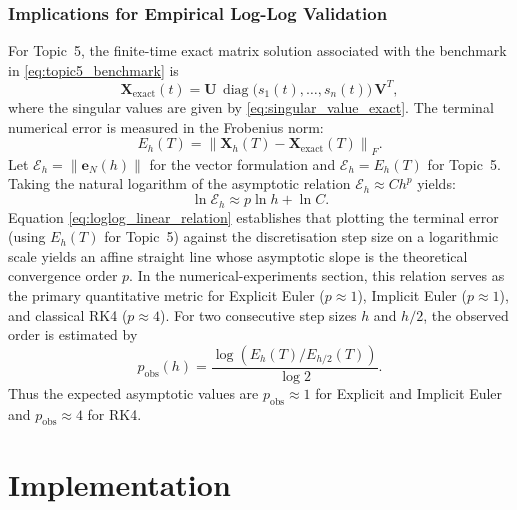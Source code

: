 \documentclass[11pt,a4paper]{article}
\theoremstyle{definition}
\theoremstyle{remark}
\begin{document}
\subsubsection{Implications for Empirical Log-Log Validation}
For Topic~5, the finite-time exact matrix solution associated with the
benchmark in \eqref{eq:topic5_benchmark} is
\begin{equation}
\label{eq:topic5_exact_matrix_solution}
\mathbf{X}_{\mathrm{exact}}(t)
=
\mathbf{U}\,\operatorname{diag}\bigl(s_1(t),\ldots,s_n(t)\bigr)\,\mathbf{V}^T,
\end{equation}
where the singular values are given by \eqref{eq:singular_value_exact}.
The terminal numerical error is measured in the Frobenius norm:
\begin{equation}
\label{eq:topic5_frobenius_error}
E_h(T)=\left\|\mathbf{X}_h(T)-\mathbf{X}_{\mathrm{exact}}(T)\right\|_F.
\end{equation}
Let $\mathcal{E}_h=\|\mathbf{e}_N(h)\|$ for the vector formulation
and $\mathcal{E}_h=E_h(T)$ for Topic~5. Taking the natural logarithm of
the asymptotic relation $\mathcal{E}_h\approx C h^p$ yields:
\begin{equation}
\label{eq:loglog_linear_relation}
\ln \mathcal{E}_h \approx p \ln h + \ln C.
\end{equation}
Equation \eqref{eq:loglog_linear_relation} establishes that plotting the
terminal error (using $E_h(T)$ for Topic~5) against the discretisation
step size on a logarithmic scale yields an affine straight line whose
asymptotic slope is the theoretical convergence order $p$. In the
numerical-experiments section, this relation serves as the primary
quantitative metric for Explicit Euler ($p\approx1$), Implicit Euler
($p\approx1$), and classical RK4 ($p\approx4$).
For two consecutive step sizes $h$ and $h/2$, the observed order is
estimated by
\begin{equation}
\label{eq:observed_order}
p_{\mathrm{obs}}(h)
=
\frac{\log\left(E_h(T)/E_{h/2}(T)\right)}{\log 2}.
\end{equation}
Thus the expected asymptotic values are $p_{\mathrm{obs}}\approx1$ for
Explicit and Implicit Euler and $p_{\mathrm{obs}}\approx4$ for RK4.

\newpage
\section{Implementation}
\end{document}
